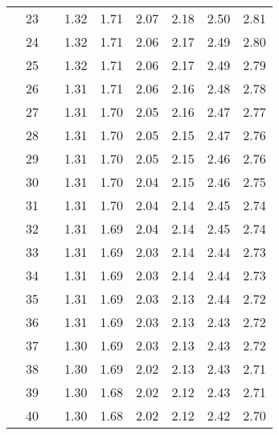 \documentclass[12pt,letterpaper]{article}
\begin{document}
\begin{center}
\begin{tabular}{|l r | l c c c c c c|}
&23&& 1.32 & 1.71 & 2.07 & 2.18 & 2.50 & 2.81\\ 
&24&& 1.32 & 1.71 & 2.06 & 2.17 & 2.49 & 2.80\\ 
&25&& 1.32 & 1.71 & 2.06 & 2.17 & 2.49 & 2.79\\ 
&26&& 1.31 & 1.71 & 2.06 & 2.16 & 2.48 & 2.78\\ 
&27&& 1.31 & 1.70 & 2.05 & 2.16 & 2.47 & 2.77\\ 
&28&& 1.31 & 1.70 & 2.05 & 2.15 & 2.47 & 2.76\\ 
&29&& 1.31 & 1.70 & 2.05 & 2.15 & 2.46 & 2.76\\ 
&30&& 1.31 & 1.70 & 2.04 & 2.15 & 2.46 & 2.75\\ 
&31&& 1.31 & 1.70 & 2.04 & 2.14 & 2.45 & 2.74\\ 
&32&& 1.31 & 1.69 & 2.04 & 2.14 & 2.45 & 2.74\\ 
&33&& 1.31 & 1.69 & 2.03 & 2.14 & 2.44 & 2.73\\ 
&34&& 1.31 & 1.69 & 2.03 & 2.14 & 2.44 & 2.73\\ 
&35&& 1.31 & 1.69 & 2.03 & 2.13 & 2.44 & 2.72\\ 
&36&& 1.31 & 1.69 & 2.03 & 2.13 & 2.43 & 2.72\\ 
&37&& 1.30 & 1.69 & 2.03 & 2.13 & 2.43 & 2.72\\ 
&38&& 1.30 & 1.69 & 2.02 & 2.13 & 2.43 & 2.71\\ 
&39&& 1.30 & 1.68 & 2.02 & 2.12 & 2.43 & 2.71\\ 
&40&& 1.30 & 1.68 & 2.02 & 2.12 & 2.42 & 2.70\\  \hline
\end{tabular}


\end{center}
\end{document}
